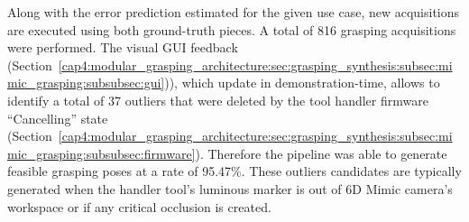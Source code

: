 \begin{table}[h!]
\end{table}


Along with the error prediction estimated for the given use case, new acquisitions are executed using both ground-truth pieces. A total of 816 grasping acquisitions were performed. The visual \ac{GUI} feedback (Section~\ref{cap4:modular_grasping_architecture:sec:grasping_synthesis:subsec:mimic_grasping:subsubsec:gui})), which update in demonstration-time, allows to identify  a total of 37 outliers that were deleted by the tool handler firmware ``Cancelling'' state (Section~\ref{cap4:modular_grasping_architecture:sec:grasping_synthesis:subsec:mimic_grasping:subsubsec:firmware}). Therefore the pipeline was able to generate feasible grasping poses at a rate of 95.47\%. These outliers candidates are typically generated when the handler tool's luminous marker is out of 6D Mimic camera's workspace or if any critical occlusion is created. 


